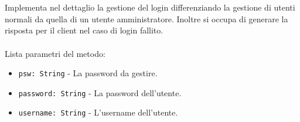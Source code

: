 \documentclass[a4paper]{article}
\begin{document}
			\\ \\
			Implementa nel dettaglio la gestione del login differenziando la gestione di utenti normali da quella di un utente amministratore. Inoltre si occupa di generare la risposta per il client nel caso di login fallito.
			\\ \\
			Lista parametri del metodo:
			\begin{itemize}
				\item \texttt{psw: String} - La password da gestire.
				\item \texttt{password: String} - La password dell'utente.
				\item \texttt{username: String} - L'username dell'utente.
			\end{itemize}
			
\end{document}
